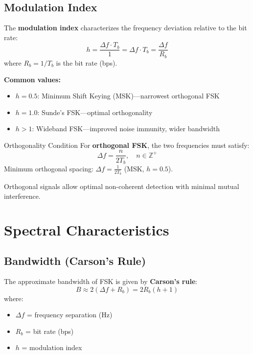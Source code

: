 \subsection{Modulation Index}

The \textbf{modulation index} characterizes the frequency deviation relative to the bit rate:
\begin{equation}
h = \frac{\Delta f \cdot T_b}{1} = \Delta f \cdot T_b = \frac{\Delta f}{R_b}
\end{equation}
where $R_b = 1/T_b$ is the bit rate (bps).

\textbf{Common values:}
\begin{itemize}
\item $h = 0.5$: Minimum Shift Keying (MSK)---narrowest orthogonal FSK
\item $h = 1.0$: Sunde's FSK---optimal orthogonality
\item $h > 1$: Wideband FSK---improved noise immunity, wider bandwidth
\end{itemize}

\begin{calloutbox}{Orthogonality Condition}
For \textbf{orthogonal FSK}, the two frequencies must satisfy:
\begin{equation}
\Delta f = \frac{n}{2T_b}, \quad n \in \mathbb{Z}^+
\end{equation}
Minimum orthogonal spacing: $\Delta f = \frac{1}{2T_b}$ (MSK, $h = 0.5$).

Orthogonal signals allow optimal non-coherent detection with minimal mutual interference.
\end{calloutbox}

\section{Spectral Characteristics}

\subsection{Bandwidth (Carson's Rule)}

The approximate bandwidth of FSK is given by \textbf{Carson's rule}:
\begin{equation}
B \approx 2(\Delta f + R_b) = 2R_b(h + 1)
\end{equation}
where:
\begin{itemize}
\item $\Delta f$ = frequency separation (Hz)
\item $R_b$ = bit rate (bps)
\item $h$ = modulation index
\end{itemize}


